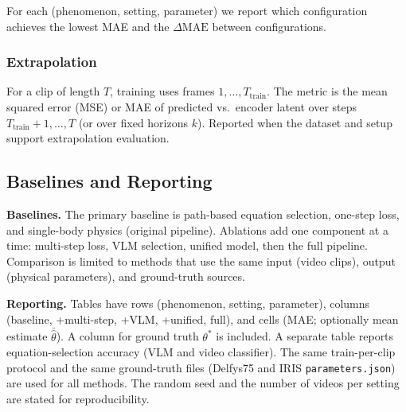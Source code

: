 For each (phenomenon, setting, parameter) we report which configuration achieves the lowest MAE and the $\Delta\mathrm{MAE}$ between configurations.

\subsubsection{Extrapolation}
\label{sec:metrics_extra}

For a clip of length $T$, training uses frames $1, \ldots, T_{\mathrm{train}}$. The metric is the mean squared error (MSE) or MAE of predicted vs.\ encoder latent over steps $T_{\mathrm{train}}+1, \ldots, T$ (or over fixed horizons $k$). Reported when the dataset and setup support extrapolation evaluation.

\subsection{Baselines and Reporting}
\label{sec:eval_baselines}

\textbf{Baselines.} The primary baseline is path-based equation selection, one-step loss, and single-body physics (original pipeline). Ablations add one component at a time: multi-step loss, VLM selection, unified model, then the full pipeline. Comparison is limited to methods that use the same input (video clips), output (physical parameters), and ground-truth sources.

\textbf{Reporting.} Tables have rows (phenomenon, setting, parameter), columns (baseline, +multi-step, +VLM, +unified, full), and cells (MAE; optionally mean estimate $\bar{\hat{\theta}}$). A column for ground truth $\theta^*$ is included. A separate table reports equation-selection accuracy (VLM and video classifier). The same train-per-clip protocol and the same ground-truth files (Delfys75 and IRIS \texttt{parameters.json}) are used for all methods. The random seed and the number of videos per setting are stated for reproducibility.
